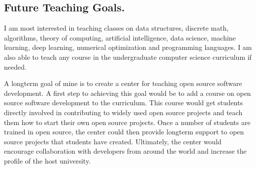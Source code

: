 \documentclass[12pt]{article}
\begin{document}

\vspace{-0.15in}
\subsection*{Future Teaching Goals.}

I am most interested in teaching classes on data structures, discrete math, algorithms, theory of computing, artificial intelligence, data science, machine learning, deep learning, numerical optimization and programming languages.
I am also able to teach any course in the undergraduate computer science curriculum if needed.

A longterm goal of mine is to create a center for teaching open source software development.
A first step to achieving this goal would be to add a course on open source software development to the curriculum.
This course would get students directly involved in contributing to widely used open source projects and teach them how to start their own open source projects.
Once a number of students are trained in open source,
the center could then provide longterm support to open source projects that students have created.
Ultimately, the center would encourage collaboration with developers from around the world and increase the profile of the host university.
\end{document}
